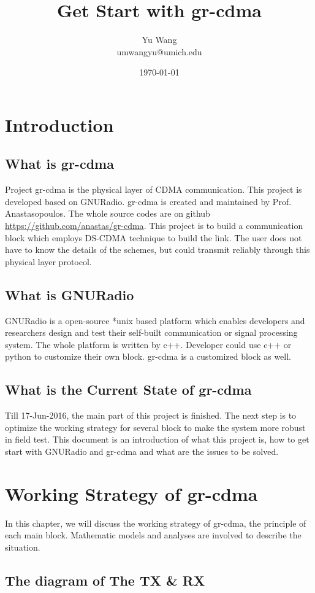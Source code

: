 \documentclass[a4paper]{report}
\title{Get Start with gr-cdma}
\author{Yu Wang\\umwangyu@umich.edu}
\date{\today}
\begin{document}
\maketitle
\tableofcontents
\newpage


\chapter{Introduction}
\section{What is gr-cdma}
Project gr-cdma is the physical layer of CDMA communication. This project is developed based on GNURadio\cite{GNURadio}.
gr-cdma is created and maintained by Prof. Anastasopoulos.
The whole source codes are on github \url{https://github.com/anastas/gr-cdma}.
This project is to build a communication block which employs DS-CDMA technique to build the link.
The user does not have to know the details of the schemes, but could transmit reliably through this physical layer protocol.

\section{What is GNURadio}
GNURadio\cite{GNURadio} is a open-source *unix based platform which enables developers and researchers design and test their self-built communication or signal processing system.
The whole platform is written by c++. Developer could use c++ or python to customize their own block. gr-cdma is a customized block as well.

\section{What is the Current State of gr-cdma}
Till 17-Jun-2016, the main part of this project is finished.
The next step is to optimize the working strategy for several block to make the system more robust in field test. 
This document is an introduction of what this project is, how to get start with GNURadio and gr-cdma and what are the issues to be solved. 

\chapter{Working Strategy of gr-cdma}
In this chapter, we will discuss the working strategy of gr-cdma, the principle of each main block.
Mathematic models and analyses are involved to describe the situation.

\section{The diagram of The TX \& RX}






\end{document}
